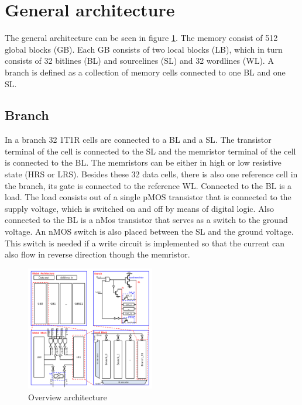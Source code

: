 \documentclass[journal]{IEEEtran}
\begin{document}
\section{General architecture}\label{Genach}
The general architecture can be seen in figure \ref{fig:architecture}. The memory consist of 512 global blocks (GB). Each GB consists of two local blocks (LB), which in turn consists of 32 bitlines (BL) and sourcelines (SL) and 32 wordlines (WL). A branch is defined as a collection of memory cells connected to one BL and one SL.

\subsection{Branch}
In a branch 32 1T1R cells are connected to a BL and a SL. The transistor terminal of the cell is connected to the SL and the memristor terminal of the cell is connected to the BL. The memristors can be either in high or low resistive state (HRS or LRS). Besides these 32 data cells, there is also one reference cell in the branch, its gate is connected to the reference WL. Connected to the BL is a load. The load consists out of a single pMOS transistor that is connected to the supply voltage, which is switched on and off by means of digital logic. Also connected to the BL is a nMos transistor that serves as a switch to the ground voltage. An nMOS switch is also placed between the SL and the ground voltage. This switch is needed if a write circuit is implemented so that the current can also flow in reverse direction though the memristor.

\begin{figure}[b!]
  \centering
  \includegraphics[width=0.5\textwidth]{../fig/paper-architecture.png}
  \caption{Overview architecture}
  \label{fig:architecture}
\end{figure}
\end{document}
